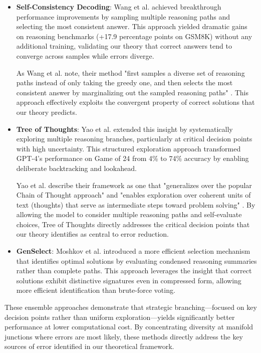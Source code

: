 \documentclass{article}
\begin{document}
\begin{itemize}
\item \textbf{Self-Consistency Decoding}: Wang et al. \citep{wang2023self} achieved breakthrough performance improvements by sampling multiple reasoning paths and selecting the most consistent answer. This approach yielded dramatic gains on reasoning benchmarks (+17.9 percentage points on GSM8K) without any additional training, validating our theory that correct answers tend to converge across samples while errors diverge.

  As Wang et al. note, their method "first samples a diverse set of reasoning paths instead of only taking the greedy one, and then selects the most consistent answer by marginalizing out the sampled reasoning paths" \citep{wang2023self}. This approach effectively exploits the convergent property of correct solutions that our theory predicts.

\item \textbf{Tree of Thoughts}: Yao et al. \citep{yao2023tree} extended this insight by systematically exploring multiple reasoning branches, particularly at critical decision points with high uncertainty. This structured exploration approach transformed GPT-4's performance on Game of 24 from 4\% to 74\% accuracy by enabling deliberate backtracking and lookahead.

  Yao et al. describe their framework as one that "generalizes over the popular Chain of Thought approach" and "enables exploration over coherent units of text (thoughts) that serve as intermediate steps toward problem solving" \citep{yao2023tree}. By allowing the model to consider multiple reasoning paths and self-evaluate choices, Tree of Thoughts directly addresses the critical decision points that our theory identifies as central to error reduction.

\item \textbf{GenSelect}: Moshkov et al. \citep{moshkov2025aimo} introduced a more efficient selection mechanism that identifies optimal solutions by evaluating condensed reasoning summaries rather than complete paths. This approach leverages the insight that correct solutions exhibit distinctive signatures even in compressed form, allowing more efficient identification than brute-force voting.
\end{itemize}

These ensemble approaches demonstrate that strategic branching—focused on key decision points rather than uniform exploration—yields significantly better performance at lower computational cost. By concentrating diversity at manifold junctions where errors are most likely, these methods directly address the key sources of error identified in our theoretical framework.
\end{document}
